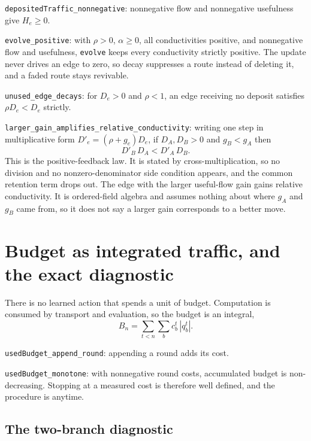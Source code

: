 \documentclass[11pt,a4paper]{article}
\theoremstyle{definition}
\newcommand{\lean}[1]{\texttt{#1}}
\begin{document}
\lean{depositedTraffic\_nonnegative}: nonnegative flow and nonnegative
usefulness give $H_e \ge 0$.

\lean{evolve\_positive}: with $\rho > 0$, $\alpha \ge 0$, all conductivities
positive, and nonnegative flow and usefulness, \lean{evolve} keeps every
conductivity strictly positive. The update never drives an edge to zero, so
decay suppresses a route instead of deleting it, and a faded route stays
revivable.

\lean{unused\_edge\_decays}: for $D_e > 0$ and $\rho < 1$, an edge receiving no
deposit satisfies $\rho D_e < D_e$ strictly.

\lean{larger\_gain\_amplifies\_relative\_conductivity}: writing one step in
multiplicative form $D'_e = (\rho + g_e) D_e$, if $D_A, D_B > 0$ and
$g_B < g_A$ then
\begin{equation}
  D'_B \, D_A < D'_A \, D_B .
\end{equation}
This is the positive-feedback law. It is stated by cross-multiplication, so no
division and no nonzero-denominator side condition appears, and the common
retention term drops out. The edge with the larger useful-flow gain gains
relative conductivity. It is ordered-field algebra and assumes nothing about
where $g_A$ and $g_B$ came from, so it does not say a larger gain corresponds
to a better move.

\section{Budget as integrated traffic, and the exact diagnostic}
\label{sec:budget}

There is no learned action that spends a unit of budget. Computation is
consumed by transport and evaluation, so the budget is an integral,
\begin{equation}
  B_n = \sum_{t<n} \sum_b c_b^{t} \, |q_b^{t}| .
\end{equation}

\lean{usedBudget\_append\_round}: appending a round adds its cost.

\lean{usedBudget\_monotone}: with nonnegative round costs, accumulated budget is
non-decreasing. Stopping at a measured cost is therefore well defined, and the
procedure is anytime.

\subsection*{The two-branch diagnostic}
\end{document}
